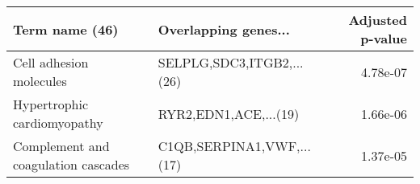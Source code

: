 \begin{tabular}{llr}
\toprule
                     Term name (46) &      Overlapping genes... &  Adjusted p-value \\
\midrule
            Cell adhesion molecules & SELPLG,SDC3,ITGB2,...(26) &          4.78e-07 \\
        Hypertrophic cardiomyopathy &     RYR2,EDN1,ACE,...(19) &          1.66e-06 \\
Complement and coagulation cascades & C1QB,SERPINA1,VWF,...(17) &          1.37e-05 \\
\bottomrule
\end{tabular}
